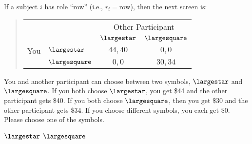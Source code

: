 \documentclass[11pt]{article}
\begin{document}
If a subject $i$ has role ``row'' (i.e., $r_i=\text{row}$), then the next screen is:
\begin{tcolorbox}
\begin{quote}
\begin{center}
\begin{tabular}{llcc}
    & & \multicolumn{2}{c}{Other Participant}  \\
& & $\largestar$ & $\largesquare$  \\ \cline{3-4}
You & $\largestar$ & \multicolumn{1}{|c|}{$44,40$} & \multicolumn{1}{c|}{$0,0$}  \\ \cline{3-4}
& $\largesquare$ & \multicolumn{1}{|c|}{$0,0$} & \multicolumn{1}{c|}{$30,34$}  \\ \cline{3-4}
\end{tabular}
\end{center}
\end{quote}

You and another participant can choose between two symbols, $\largestar$ and $\largesquare$. If you both choose $\largestar$, you get \$44 and the other participant gets \$40. If you both choose $\largesquare$, then you get \$30 and the other participant gets \$34. If you choose different symbols, you each get \$0.\\

Please choose one of the symbols.\\


\begin{center}
$\largestar$ \qquad $\largesquare$
\end{center}
\end{tcolorbox}
\end{document}
